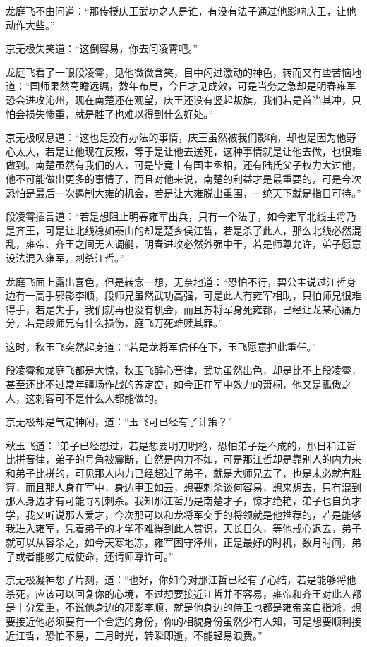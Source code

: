龙庭飞不由问道：“那传授庆王武功之人是谁，有没有法子通过他影响庆王，让他动作大些。”

京无极失笑道：“这倒容易，你去问凌霄吧。”

龙庭飞看了一眼段凌霄，见他微微含笑，目中闪过激动的神色，转而又有些苦恼地道：“国师果然高瞻远瞩，数年布局，今日才见成效，可是当务之急却是明春雍军恐会进攻沁州，现在南楚还在观望，庆王还没有竖起叛旗，我们若是首当其冲，只怕会损失惨重，就是胜了也难以得到什么好处。”

京无极叹息道：“这也是没有办法的事情，庆王虽然被我们影响，却也是因为他野心太大，若是让他现在反叛，等于是让他去送死，这种事情就是让他去做，也很难做到。南楚虽然有我们的人，可是毕竟上有国主丞相，还有陆氏父子权力大过他，他不可能做出更多的事情了，而且对他来说，南楚的利益才是最重要的，可是今次恐怕是最后一次遏制大雍的机会，若是让大雍脱出重围，一统天下就是指日可待。”

段凌霄插言道：“若是想阻止明春雍军出兵，只有一个法子，如今雍军北线主将乃是齐王，可是让北线稳如泰山的却是楚乡侯江哲，若是杀了此人，那么北线必然混乱，雍帝、齐王之间无人调艇，明春进攻必然外强中干，若是师尊允许，弟子愿意设法混入雍军，刺杀江哲。”

龙庭飞面上露出喜色，但是转念一想，无奈地道：“恐怕不行，碧公主说过江哲身边有一高手邪影李顺，段师兄虽然武功高强，可是此人有雍军相助，只怕师兄很难得手，若是失手，我们就再也没有机会，而且苏将军身死雍都，已经让龙某心痛万分，若是段师兄有什么损伤，庭飞万死难赎其罪。”

这时，秋玉飞突然起身道：“若是龙将军信任在下，玉飞愿意担此重任。”

段凌霄和龙庭飞都是大惊，秋玉飞醉心音律，武功虽然出色，却是比不上段凌霄，甚至还比不过常年疆场作战的苏定峦，如今正在军中效力的萧桐，他又是孤傲之人，这刺客可不是什么人都能做的。

京无极却是气定神闲，道：“玉飞可已经有了计策？”

秋玉飞道：“弟子已经想过，若是想要明刀明枪，恐怕弟子是不成的，那日和江哲比拼音律，弟子的号角被震断，自然是内力不如，可是那江哲却是靠别人的内力来和弟子比拼的，可见那人内力已经超过了弟子，就是大师兄去了，也是未必就有胜算，而且那人身在军中，身边甲卫如云，想要刺杀谈何容易，想来想去，只有混到那人身边才有可能寻机刺杀。我知那江哲乃是南楚才子，惊才绝艳，弟子也自负才学，我又听说那人爱才，今次那可以和龙将军交手的将领就是他推荐的，若是能够我进入雍军，凭着弟子的才学不难得到此人赏识，天长日久，等他戒心退去，弟子就可以从容杀之，如今天寒地冻，雍军困守泽州，正是最好的时机，数月时间，弟子或者能够完成使命，还请师尊许可。”

京无极凝神想了片刻，道：“也好，你如今对那江哲已经有了心结，若是能够将他杀死，应该可以回复你的心境，不过想要接近江哲并不容易，雍帝和齐王对此人都是十分爱重，不说他身边的邪影李顺，就是他身边的侍卫也都是雍帝亲自指派，想要接近他必须要有一个合适的身份，你的相貌身份虽然少有人知，可是想要顺利接近江哲，恐怕不易，三月时光，转瞬即逝，不能轻易浪费。”

